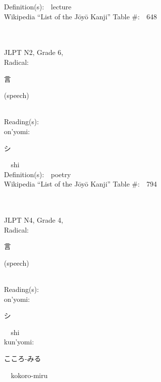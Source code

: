 \begin{multicols}{2}
Definition(s):\ \ lecture \\
Wikipedia ``List of the J\=oy\=o Kanji'' Table \#:\ \ 648 \\
\ \ \\
{\fontsize{34pt}{40pt}  }\ \ \\  %
{JLPT N2, Grade 6, \\Radical:\ \ {\begin{CJK}{UTF8}{min} 言 \end{CJK}} (speech) } \\
Reading(s):\ \ \\
{\hspace*{1em}}on'yomi:\ \ \\
{\hspace*{2em}}{\begin{CJK}{UTF8}{min} シ \end{CJK}}\ \ shi\ \ \\
Definition(s):\ \ poetry \\
Wikipedia ``List of the J\=oy\=o Kanji'' Table \#:\ \ 794 \\
\ \ \\
{\fontsize{34pt}{40pt}  }\ \ \\  %
{JLPT N4, Grade 4, \\Radical:\ \ {\begin{CJK}{UTF8}{min} 言 \end{CJK}} (speech) } \\
Reading(s):\ \ \\
{\hspace*{1em}}on'yomi:\ \ \\
{\hspace*{2em}}{\begin{CJK}{UTF8}{min} シ \end{CJK}}\ \ shi\ \ \\
{\hspace*{1em}}kun'yomi:\ \ \\
{\hspace*{2em}}{\begin{CJK}{UTF8}{min} こころ-みる \end{CJK}}\ \ kokoro-miru\ \ \\

\end{multicols}
